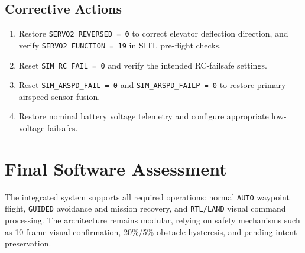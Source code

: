 \documentclass[11pt,a4paper]{article}
\begin{document}
\subsection*{\textcolor{sectioncolor}{Corrective Actions}}
\begin{enumerate}
    \setlength\itemsep{0em}
    \item Restore \texttt{SERVO2\_REVERSED = 0} to correct elevator deflection direction, and verify \texttt{SERVO2\_FUNCTION = 19} in SITL pre-flight checks.
    \item Reset \texttt{SIM\_RC\_FAIL = 0} and verify the intended RC-failsafe settings.
    \item Reset \texttt{SIM\_ARSPD\_FAIL = 0} and \texttt{SIM\_ARSPD\_FAILP = 0} to restore primary airspeed sensor fusion.
    \item Restore nominal battery voltage telemetry and configure appropriate low-voltage failsafes.
\end{enumerate}

\section*{\textcolor{sectioncolor}{Final Software Assessment}}
The integrated system supports all required operations: normal \texttt{AUTO} waypoint flight, \texttt{GUIDED} avoidance and mission recovery, and \texttt{RTL/LAND} visual command processing. The architecture remains modular, relying on safety mechanisms such as 10-frame visual confirmation, 20\%/5\% obstacle hysteresis, and pending-intent preservation.
\end{document}
